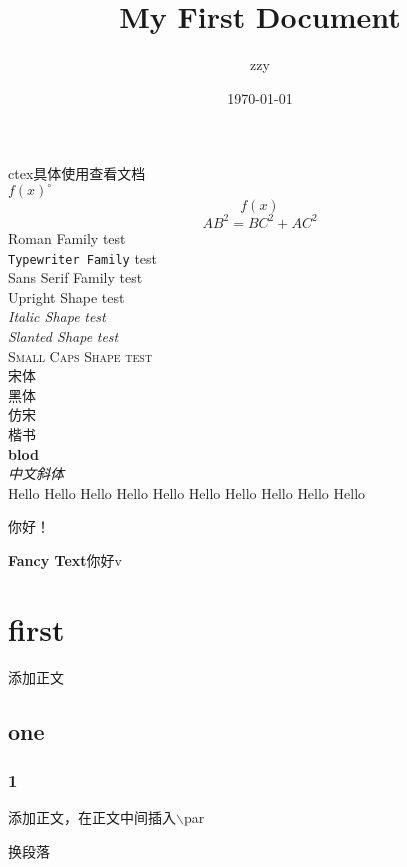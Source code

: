 \documentclass[10pt]{article} %
\title{\heiti My First Document} %
\author{zzy}
\date{\today}
\newcommand{\myfont}{\textbf{\textsf{Fancy Text}}}
\begin{document}
	\maketitle
	
	ctex具体使用查看文档\\
	$f(x)^\circ$  %
	$$f(x)$$ %
	\begin{equation} %
		AB^2 = BC ^2 + AC ^2
	\end{equation}
	\textrm{Roman Family}
	{\rmfamily test\\}
	\texttt{Typewriter Family}
	{\ttfamily test\\}
	\textsf{Sans Serif Family}
	{\sffamily test\\}
	\textup{Upright Shape}
	{\upshape test\\}
	\textit{Italic Shape}
	{\itshape test\\}
	\textsl{Slanted Shape}
	{\slshape test\\}
	\textsc{Small Caps Shape}
	{\scshape test\\}
	{\songti 宋体\\}
	{\heiti 黑体\\}
	{\fangsong 仿宋\\}
	{\kaishu 楷书\\}
	\textbf{blod\\}
	\textit{中文斜体\\}
	{\tiny Hello}
	{\scriptsize Hello}
	{\footnotesize Hello}
	{\small Hello}
	{\normalsize Hello}
	{\large Hello}
	{\Large Hello}
	{\LARGE Hello}
	{\huge Hello}	
	{\Huge Hello}	
	
	 你好！
	
	\myfont{你好v }
	
	\tableofcontents %
	\section{first}
	添加正文
		\subsection{one}
			\subsubsection{1}
			添加正文，在正文中间插入$\backslash$par \par 换段落
\end{document}
